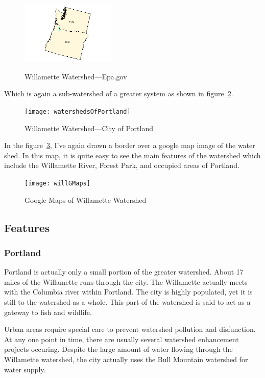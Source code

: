 \documentclass{article}
\begin{document}
\begin{figure}[H]
\centering{}
\caption{Willamette Watershed---Epa.gov}
\includegraphics[width=4.5cm]{willOverview}\label{willOverview}
\end{figure}

Which is again a sub-watershed of a greater system as shown in figure~\ref{willSubSheds}.

\begin{figure}[H]
\centering{}
\caption{Willamette Watershed---City of Portland}
\texttt{[image: watershedsOfPortland]}\label{willSubSheds}
\end{figure}


In the figure~\ref{willGMaps}, I've again drawn a border over a google map image of the water shed. In this map,
it is quite easy to see the main features of the watershed which include the Willamette River, Forest Park, and
occupied areas of Portland.

\begin{figure}[H]
\centering{}
\caption{Google Maps of Willamette Watershed}
\texttt{[image: willGMaps]}\label{willGMaps}
\end{figure}

\subsection{Features}
\subsubsection{Portland}
Portland is actually only a small portion of the greater watershed. About 17 miles of the Willamette runs through the city.
The Willamette actually meets with the Columbia river within Portland. The city is highly populated, yet it is still 
to the watershed as a whole. This part of the watershed is said to act as a gateway to fish and wildlife.

Urban areas require special care to prevent watershed pollution and disfunction. At any one point in time, there are usually
several watershed enhancement projects occuring. Despite the large amount of water flowing through the Willamette watershed,
the city actually uses the Bull Mountain watershed for water supply.
\end{document}
